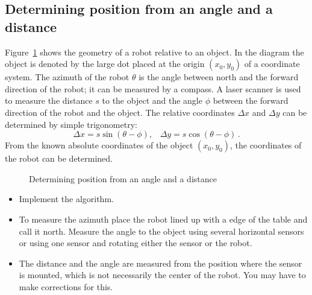 \subsection{Determining position from an angle and a distance}

Figure~\ref{fig.angle-distance} shows the geometry of a robot relative to an object. In the diagram the object is denoted by the large dot placed at the origin $(x_0,y_0)$ of a coordinate system. The azimuth of the robot $\theta$ is the angle between north and the forward direction of the robot; it can be measured by a compass. A laser scanner is used to measure the distance $s$ to the object and the angle $\phi$ between the forward direction of the robot and the object. The relative coordinates $\Delta x$ and $\Delta y$ can be determined by simple trigonometry:
\[
\Delta x = s \sin (\theta-\phi), \;\;\; \Delta y = s \cos (\theta-\phi)\,.
\]
From the known absolute coordinates of the object $(x_0,y_0)$, the coordinates of the robot can be determined.

\begin{figure}
\begin{center}
\caption{Determining position from an angle and a distance}\label{fig.angle-distance}
\end{center}
\end{figure}

\begin{framed}
\begin{itemize}
\item Implement the algorithm.
\item To measure the azimuth place the robot lined up with a edge of the table and call it north. Measure the angle to the object using several horizontal sensors or using one sensor and rotating either the sensor or the robot.
\item The distance and the angle are measured from the position where the sensor is mounted, which is not necessarily the center of the robot. You may have to make corrections for this.
\end{itemize}
\end{framed}

